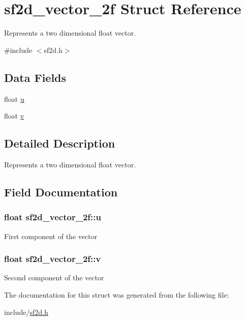 \hypertarget{structsf2d__vector__2f}{}\section{sf2d\+\_\+vector\+\_\+2f Struct Reference}
\label{structsf2d__vector__2f}


Represents a two dimensional float vector.  




{\ttfamily \#include $<$sf2d.\+h$>$}

\subsection*{Data Fields}
\begin{DoxyCompactItemize}
\item 
float \hyperlink{structsf2d__vector__2f_aabe555907fa0cee95076998b0a23aed9}{u}
\item 
float \hyperlink{structsf2d__vector__2f_ae9cab2d0f74baf57efbdbfdffa8492b9}{v}
\end{DoxyCompactItemize}


\subsection{Detailed Description}
Represents a two dimensional float vector. 

\subsection{Field Documentation}
\hypertarget{structsf2d__vector__2f_aabe555907fa0cee95076998b0a23aed9}{}
\subsubsection[{u}]{\setlength{\rightskip}{0pt plus 5cm}float sf2d\+\_\+vector\+\_\+2f\+::u}\label{structsf2d__vector__2f_aabe555907fa0cee95076998b0a23aed9}
First component of the vector \hypertarget{structsf2d__vector__2f_ae9cab2d0f74baf57efbdbfdffa8492b9}{}
\subsubsection[{v}]{\setlength{\rightskip}{0pt plus 5cm}float sf2d\+\_\+vector\+\_\+2f\+::v}\label{structsf2d__vector__2f_ae9cab2d0f74baf57efbdbfdffa8492b9}
Second component of the vector 

The documentation for this struct was generated from the following file\+:\begin{DoxyCompactItemize}
\item 
include/\hyperlink{sf2d_8h}{sf2d.\+h}\end{DoxyCompactItemize}

